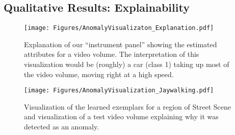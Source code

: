 \begin{table}[tb]
\setlength{\tabcolsep}{8pt}
\centering
{}
\caption{RBDC and TBDC AUC scores (in \%) of various baseline methods on Street Scene dataset. The top score for each metric is highlighted in , while the second best score is highlighted in . }
\label{t2}
\vspace{-5pt}
\end{table}

\subsection{Qualitative Results: Explainability}
\label{sec:explainability}

\begin{figure*}[tb]
    \centering
    \texttt{[image: Figures/AnomalyVisualizaton\_Explanation.pdf]}
    \caption{Explanation of our ``instrument panel'' showing the estimated attributes for a video volume. The interpretation of this visualization would be (roughly) a car (class 1) taking up most of the video volume, moving right at a high speed.}
    \label{fig:viz_explanation}
\vspace{-10pt}
\end{figure*}

\begin{figure}[tb]
    \centering
    \texttt{[image: Figures/AnomalyVisualization\_Jaywalking.pdf]}
    \caption{Visualization of the learned exemplars for a region of Street Scene and visualization of a test video volume explaining why it was detected as an anomaly.}
    \label{fig:visualization_jaywalk}
\vspace{-8pt}
\end{figure}

